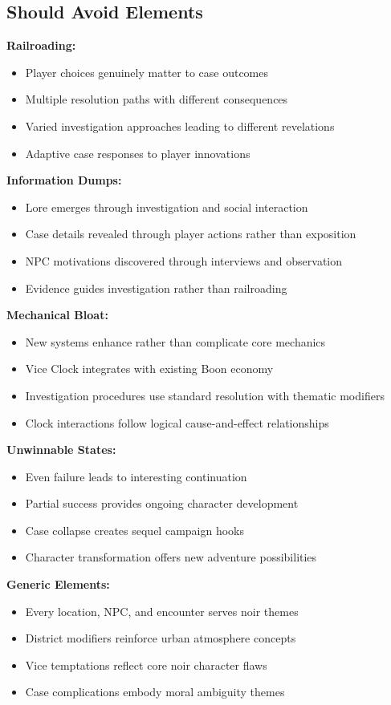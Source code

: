 \documentclass[11pt]{article}
\begin{document}
\subsection{Should Avoid Elements}

\textbf{Railroading:}
\begin{itemize}
\item Player choices genuinely matter to case outcomes
\item Multiple resolution paths with different consequences
\item Varied investigation approaches leading to different revelations
\item Adaptive case responses to player innovations
\end{itemize}

\textbf{Information Dumps:}
\begin{itemize}
\item Lore emerges through investigation and social interaction
\item Case details revealed through player actions rather than exposition
\item NPC motivations discovered through interviews and observation
\item Evidence guides investigation rather than railroading
\end{itemize}

\textbf{Mechanical Bloat:}
\begin{itemize}
\item New systems enhance rather than complicate core mechanics
\item Vice Clock integrates with existing Boon economy
\item Investigation procedures use standard resolution with thematic modifiers
\item Clock interactions follow logical cause-and-effect relationships
\end{itemize}

\textbf{Unwinnable States:}
\begin{itemize}
\item Even failure leads to interesting continuation
\item Partial success provides ongoing character development
\item Case collapse creates sequel campaign hooks
\item Character transformation offers new adventure possibilities
\end{itemize}

\textbf{Generic Elements:}
\begin{itemize}
\item Every location, NPC, and encounter serves noir themes
\item District modifiers reinforce urban atmosphere concepts
\item Vice temptations reflect core noir character flaws
\item Case complications embody moral ambiguity themes
\end{itemize}
\end{document}
